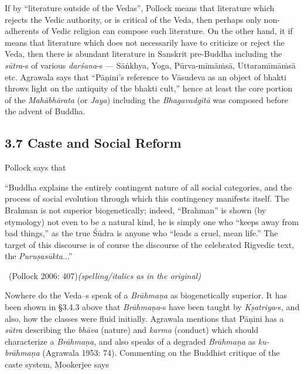 If by “literature outside of the Vedas”, Pollock means that literature which rejects the Vedic authority, or is critical of the Veda, then perhaps only non-adherents of Vedic religion can compose such literature. On the other hand, it if means that literature which does not necessarily have to criticize or reject the Veda, then there is abundant literature in Sanskrit pre-Buddha including the \textit{sūtra}-s of various \textit{darśana}-s — {Sāṅkhya}, {Yoga}, {Pūrva-mīmāṁsā}, {Uttaramīmāṁsā} etc. Agrawala says that “Pāṇini’s reference to Vāsudeva as an object of bhakti throws light on the antiquity of the bhakti cult,” hence at least the core portion of the \textit{Mahābhārata} (or \textit{Jaya}) including the \textit{Bhagavadgītā} was composed before the advent of Buddha.


\subsection*{3.7 Caste and Social Reform}

Pollock says that

\begin{myquote}
“Buddha explains the entirely contingent nature of all social categories, and the process of social evolution through which this contingency manifests itself. The Brahman is not superior biogenetically; indeed, “Brahman” is shown (by etymology) not even to be a natural kind, he is simply one who “keeps away from bad things,” as the true Śūdra is anyone who “leads a cruel, mean life.” The target of this discourse is of course the discourse of the celebrated Rigvedic text, the \textit{Puruṣasūkta}...” 

~\hfill (Pollock 2006: 407)\textit{(spelling/italics as in the original)}
\end{myquote}

Nowhere do the Veda--s speak of a \textit{Brāhmaṇa} as biogenetically superior. It has been shown in §3.4.3 above that \textit{Brāhmaṇa}-s have been taught by \textit{Kṣatriya}-s, and also, how the classes were fluid initially. Agrawala mentions that Pāṇini has a \textit{sūtra} describing the \textit{bhāva} (nature) and \textit{karma} (conduct) which should characterize a \textit{Brāhmaṇa}, and also speaks of a degraded \textit{Brāhmaṇa} as \textit{ku-brāhmaṇa} (Agrawala 1953: 74). Commenting on the Buddhist critique of the caste system, Mookerjee says

